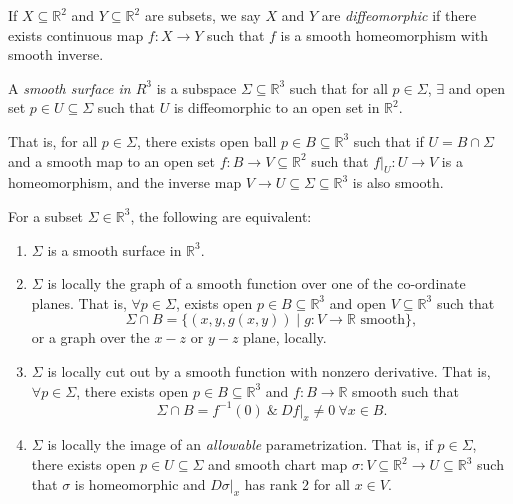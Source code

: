 \begin{definition}
    If \(X \subseteq \mathbb{R}^2\) and \(Y \subseteq \mathbb{R}^2\) are subsets, we say \(X\) and \(Y\) are \textit{diffeomorphic} if there exists continuous map \(f: X \to Y\) such that \(f\) is a smooth homeomorphism with smooth inverse.
\end{definition}
\begin{definition}
    A \textit{smooth surface in \(R^3\)} is a subspace \(\Sigma\subseteq \mathbb{R}^3\) such that for all \(p \in \Sigma\), \(\exists\) and open set \(p \in U \subseteq \Sigma\) such that \(U\) is diffeomorphic to an open set in \(\mathbb{R}^2\).

    That is, for all \(p \in \Sigma\), there exists open ball \(p \in B \subseteq \mathbb{R}^3\) such that if \(U = B \cap \Sigma\) and a smooth map to an open set \(f: B\to V \subseteq \mathbb{R}^2\) such that \(\left. f\right|_{U}:U\to V\) is a homeomorphism, and the inverse map \(V \to U \subseteq \Sigma \subseteq \mathbb{R}^3\) is also smooth.
\end{definition}
\begin{theorem}
    \label{abseq}
    For a subset \(\Sigma\in \mathbb{R}^3\), the following are equivalent:
    \begin{enumerate}
        \item \(\Sigma\) is a smooth surface in \(\mathbb{R}^3\).
        \item \(\Sigma\) is locally the graph of a smooth function over one of the co-ordinate planes. That is, \(\forall p \in \Sigma\), exists open \(p \in B \subseteq \mathbb{R}^3\) and open \(V \subseteq \mathbb{R}^3\) such that
        \[
            \Sigma \cap B = \{(x,y,g(x,y))\mid g:V \to \mathbb{R} \text{ smooth}\},
        \]
        or a graph over the \(x-z\) or \(y-z\) plane, locally.
        \item \(\Sigma\) is locally cut out by a smooth function with nonzero derivative. That is, \(\forall p \in \Sigma\), there exists open \(p \in B \subseteq \mathbb{R}^3\) and \(f: B \to \mathbb{R}\) smooth such that
        \[
            \Sigma \cap B = f^{-1}(0)~\&~\left. Df\right|_x \neq 0~\forall x \in B.
        \]
        \item \(\Sigma\) is locally the image of an \textit{allowable} parametrization. That is, if \(p \in \Sigma\), there exists open \(p \in U \subseteq \Sigma\) and smooth chart map \(\sigma: V\subseteq \mathbb{R}^2 \to U\subseteq\mathbb{R}^3\) such that \(\sigma\) is homeomorphic and \(\left.D\sigma \right|_x\) has rank 2 for all \(x \in V\).
    \end{enumerate} 
\end{theorem}
